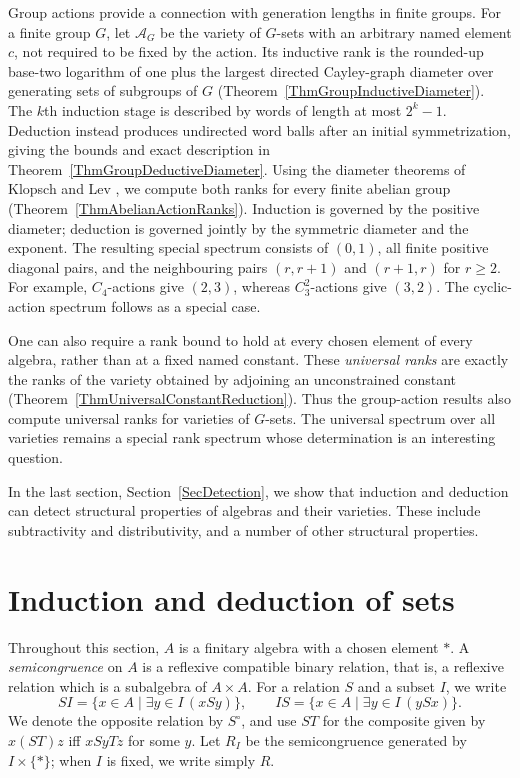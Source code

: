 \documentclass[12pt,english]{amsart}
\theoremstyle{definition}
\numberwithin{equation}{section}
\theoremstyle{remark}
\renewcommand{\top}{\ast}
\begin{document}
Group actions provide a connection with generation lengths in finite groups. For a finite group $G$, let $\mathcal A_G$ be the variety of $G$-sets with an arbitrary named element $c$, not required to be fixed by the action. Its inductive rank is the rounded-up base-two logarithm of one plus the largest directed Cayley-graph diameter over generating sets of subgroups of $G$ (Theorem~\ref{ThmGroupInductiveDiameter}). The $k$th induction stage is described by words of length at most $2^k-1$. Deduction instead produces undirected word balls after an initial symmetrization, giving the bounds and exact description in Theorem~\ref{ThmGroupDeductiveDiameter}. Using the diameter theorems of Klopsch and Lev \cite{KL03,KL09}, we compute both ranks for every finite abelian group (Theorem~\ref{ThmAbelianActionRanks}). Induction is governed by the positive diameter; deduction is governed jointly by the symmetric diameter and the exponent. The resulting special spectrum consists of $(0,1)$, all finite positive diagonal pairs, and the neighbouring pairs $(r,r+1)$ and $(r+1,r)$ for $r\geqslant2$. For example, $C_4$-actions give $(2,3)$, whereas $C_3^2$-actions give $(3,2)$. The cyclic-action spectrum follows as a special case.

One can also require a rank bound to hold at every chosen element of every algebra, rather than at a fixed named constant. These \emph{universal ranks} are exactly the ranks of the variety obtained by adjoining an unconstrained constant (Theorem~\ref{ThmUniversalConstantReduction}). Thus the group-action results also compute universal ranks for varieties of $G$-sets. The universal spectrum over all varieties remains a special rank spectrum whose determination is an interesting question.

In the last section, Section~\ref{SecDetection}, we show that induction
and deduction can detect structural properties of algebras and their
varieties. These include subtractivity and distributivity, and a number of other structural properties.

\clearpage
\begingroup
\small
\tableofcontents
\endgroup

\section{Induction and deduction of sets}\label{SecClosures}

Throughout this section, $A$ is a finitary algebra with a chosen element $\top$. A \emph{semicongruence} on $A$ is a reflexive compatible binary relation, that is, a reflexive relation which is a subalgebra of $A\times A$. For a relation $S$ and a subset $I$, we write
\[
SI=\{x\in A\mid \exists y\in I\,(xSy)\},
\qquad
IS=\{x\in A\mid \exists y\in I\,(ySx)\}.
\]
We denote the opposite relation by $S^\circ$, and use $ST$ for the composite given by $x(ST)z$ iff $xSyTz$ for some $y$. Let $R_I$ be the semicongruence generated by $I\times\{\top\}$; when $I$ is fixed, we write simply $R$.
\end{document}
